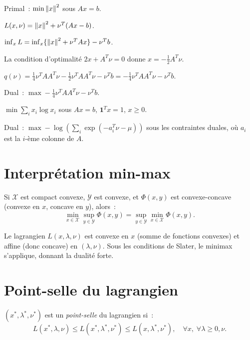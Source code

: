 \begin{exemple}
Primal~: $\min \left\| x \right\|^2$ sous $Ax = b$.

$L(x, \nu) = \left\| x \right\|^2 + \nu^T(Ax - b)$.

$\inf_x L = \inf_x \{\left\| x \right\|^2 + \nu^TAx\} - \nu^Tb$.

La condition d'optimalit\'e $2x + A^T\nu = 0$ donne $x = -\frac{1}{2}A^T\nu$.

$q(\nu) = \frac{1}{4}\nu^TAA^T\nu - \frac{1}{2}\nu^TAA^T\nu - \nu^Tb = -\frac{1}{4}\nu^TAA^T\nu - \nu^Tb$.

Dual~: $\max -\frac{1}{4}\nu^TAA^T\nu - \nu^Tb$.
\end{exemple}

\begin{exemple}
$\min \sum_i x_i \log x_i$ sous $Ax = b$, $\mathbf{1}^Tx = 1$, $x \geq 0$.

Dual~: $\max -\log\left(\sum_i \exp(-a_i^T\nu - \mu)\right)$ sous les contraintes
duales, o\`u $a_i$ est la $i$-\`eme colonne de $A$.
\end{exemple}

\section{Interpr\'etation min-max}

\begin{theoreme}
Si $\mathcal{X}$ est compact convexe, $\mathcal{Y}$ est convexe, et $\Phi(x,y)$
est convexe-concave (convexe en $x$, concave en $y$), alors~:
\[
    \min_{x \in \mathcal{X}} \sup_{y \in \mathcal{Y}} \Phi(x,y)
    = \sup_{y \in \mathcal{Y}} \min_{x \in \mathcal{X}} \Phi(x,y).
\]
\end{theoreme}

\begin{remarque}
Le lagrangien $L(x, \lambda, \nu)$ est convexe en $x$ (somme de fonctions convexes)
et affine (donc concave) en $(\lambda, \nu)$. Sous les conditions de Slater, le
minimax s'applique, donnant la dualit\'e forte.
\end{remarque}

\section{Point-selle du lagrangien}

\begin{definition}
$(x^*, \lambda^*, \nu^*)$ est un \emph{point-selle} du lagrangien si~:
\[
    L(x^*, \lambda, \nu) \leq L(x^*, \lambda^*, \nu^*) \leq L(x, \lambda^*, \nu^*),
    \quad \forall x, \; \forall \lambda \geq 0, \nu.
\]
\end{definition}

